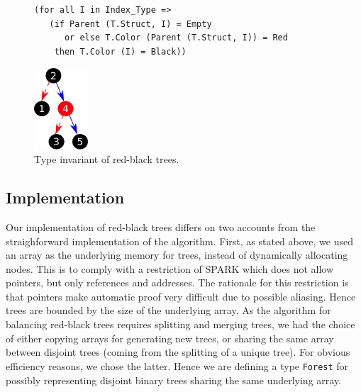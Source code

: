 \documentclass{llncs}
\begin{document}
\begin{figure}[ht]
\begin{minipage}[c]{.77\linewidth}
\begin{small}
\begin{lstlisting}
(for all I in Index_Type =>
   (if Parent (T.Struct, I) = Empty
      or else T.Color (Parent (T.Struct, I)) = Red
    then T.Color (I) = Black))
\end{lstlisting}
\end{small}
\end{minipage}\hfill
\begin{minipage}[c]{.22\linewidth}
\begin{center}
\includegraphics[width=2cm]{red_black.pdf}
\end{center}
\end{minipage}
\caption{\label{fig-rbt} Type invariant of red-black trees.}
\vspace{-0.5cm}
\end{figure}

\subsection{Implementation}
\label{sec-implementation}

Our implementation of red-black trees differs on two accounts from the
straighforward implementation of the algorithm. First, as stated above,
we used an array as the
underlying memory for trees, instead of dynamically allocating nodes. This is
to comply with a restriction of SPARK which does not allow pointers, but only
references and addresses. The rationale for this restriction is that pointers
make automatic proof very difficult due to possible aliasing. Hence trees are
bounded by the size of the underlying array. As the algorithm for balancing
red-black trees requires splitting and merging trees, we had the choice of
either copying arrays for generating new trees, or sharing the same array
between disjoint trees (coming from the splitting of a unique tree). For
obvious efficiency reasons, we chose the latter. Hence we are defining a type
\texttt{Forest} for possibly representing disjoint binary trees sharing the
same underlying array.
\end{document}
